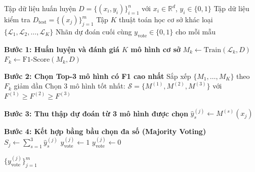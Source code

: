 
\begin{algorithm}[htbp]
\caption{Thuật toán Majority Voting Ensemble}
\label{voting_ag}
\begin{algorithmic}[1]
\Require Tập dữ liệu huấn luyện $D = \{(x_i, y_i)\}_{i=1}^{n}$ với $x_i \in \mathbb{R}^d$, $y_i \in \{0, 1\}$
\Statex \qquad Tập dữ liệu kiểm tra $D_{\text{test}} = \{(x_j)\}_{j=1}^{m}$
\Statex \qquad Tập $K$ thuật toán học cơ sở khác loại $\{\mathcal{L}_1, \mathcal{L}_2, \dots, \mathcal{L}_K\}$
\Ensure Nhãn dự đoán cuối cùng $y_{\text{vote}} \in \{0, 1\}$ cho mỗi mẫu

\State \textbf{Bước 1: Huấn luyện và đánh giá $K$ mô hình cơ sở}
    \State $M_k \gets \text{Train}(\mathcal{L}_k, D)$ 
    \State $F_k \gets \text{F1-Score}(M_k, D)$ 
\EndFor

\State \textbf{Bước 2: Chọn Top-3 mô hình có F1 cao nhất}
\State Sắp xếp $\{M_1, \dots, M_K\}$ theo $F_k$ giảm dần
\State Chọn 3 mô hình tốt nhất: $\mathcal{S} = \{M^{(1)}, M^{(2)}, M^{(3)}\}$ với $F^{(1)} \geq F^{(2)} \geq F^{(3)}$

\State \textbf{Bước 3: Thu thập dự đoán từ 3 mô hình được chọn}
        \State $\hat{y}_s^{(j)} \gets M^{(s)}(x_j)$ 
    \EndFor
\EndFor

\State \textbf{Bước 4: Kết hợp bằng bầu chọn đa số (Majority Voting)}
    \State $S_j \gets \displaystyle\sum_{s=1}^{3} \hat{y}_s^{(j)}$ 
        \State $y_{\text{vote}}^{(j)} \gets 1$ 
    \Else
        \State $y_{\text{vote}}^{(j)} \gets 0$ 
    \EndIf
\EndFor

\State \Return $\{y_{\text{vote}}^{(j)}\}_{j=1}^{m}$
\end{algorithmic}
\end{algorithm}
